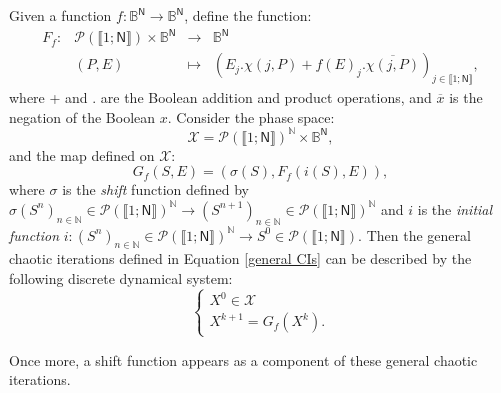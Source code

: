 \documentclass{article}
\begin{document}
Given a function $f:\mathds{B}^\mathsf{N} \longrightarrow \mathds{B}^\mathsf{N} $, define the function:
\begin{equation}
\begin{array}{lrll}
F_{f}: & \mathcal{P}\left(\llbracket1;\mathsf{N}\rrbracket \right) \times \mathds{B}^{\mathsf{N}} &
\longrightarrow & \mathds{B}^{\mathsf{N}} \\
& (P,E) & \longmapsto & \left( E_{j}.\chi (j,P)+f(E)_{j}.\overline{\chi
(j,P)}\right) _{j\in \llbracket1;\mathsf{N}\rrbracket},\end{array}\end{equation}where + and . are the Boolean addition and product operations, and $\overline{x}$ 
is the negation of the Boolean $x$.
Consider the phase space:
\begin{equation}
\mathcal{X} = \mathcal{P}\left(\llbracket 1 ; \mathsf{N} \rrbracket\right)^\mathds{N} \times
\mathds{B}^\mathsf{N},
\end{equation}
\noindent and the map defined on $\mathcal{X}$:
\begin{equation}
G_f\left(S,E\right) = \left(\sigma(S), F_f(i(S),E)\right), \label{Gf}
\end{equation}
\noindent where $\sigma$ is the \emph{shift} function defined by $\sigma
(S^{n})_{n\in \mathds{N}}\in \mathcal{P}\left(\llbracket 1 ; \mathsf{N} \rrbracket\right)^\mathds{N}\longrightarrow (S^{n+1})_{n\in
\mathds{N}}\in \mathcal{P}\left(\llbracket 1 ; \mathsf{N} \rrbracket\right)^\mathds{N}$ and $i$ is the \emph{initial function} 
$i:(S^{n})_{n\in \mathds{N}} \in \mathcal{P}\left(\llbracket 1 ; \mathsf{N} \rrbracket\right)^\mathds{N}\longrightarrow S^{0}\in \mathcal{P}\left(\llbracket 1 ; \mathsf{N} \rrbracket\right)$. 
Then the general chaotic iterations defined in Equation \ref{general CIs} can 
be described by the following discrete dynamical system:
\begin{equation}
\left\{
\begin{array}{l}
X^0 \in \mathcal{X} \\
X^{k+1}=G_{f}(X^k).\end{array}\right.
\end{equation}

Once more, a shift function appears as a component of these general chaotic 
iterations. 
\end{document}
